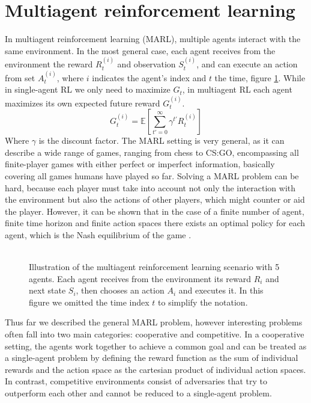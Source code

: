 \section{Multiagent reinforcement learning}
In multiagent reinforcement learning (MARL), multiple agents interact with the same environment. In the most general case, each agent receives from the environment the reward $R_t^{(i)}$ and observation $S_t^{(i)}$, and can execute an action from set $A_t^{(i)}$, where $i$ indicates the agent's index and $t$ the time, figure \ref{fig:marl}. While in single-agent RL we only need to maximize $G_t$, in multiagent RL each agent maximizes its own expected future reward $G_t^{(i)}$.
\begin{equation}
    G_t^{(i)} = \mathbb{E}\left[ \sum_{t'=0}^{\infty} \gamma^{t'} R_t^{(i)} \right]
    \label{eq:marl-gt}
\end{equation}    
Where $\gamma$ is the discount factor.
The MARL setting is very general, as it can describe a wide range of games, ranging from chess to CS:GO, encompassing all finite-player games with either perfect or imperfect information, basically covering all games humans have played so far. Solving a MARL problem can be hard, because each player must take into account not only the interaction with the environment but also the actions of other players, which might counter or aid the player. However, it can be shown that in the case of a finite number of agent, finite time horizon and finite action spaces there exists an optimal policy for each agent, which is the Nash equilibrium of the game \cite{nash-equilibrium-wikipedia}.\\\\
\begin{figure}[H]
    \centering
    
    \caption{Illustration of the multiagent reinforcement learning scenario with 5 agents. Each agent receives from the environment its reward $R_i$ and next state $S_i$, then chooses an action $A_i$ and executes it. In this figure we omitted the time index $t$ to simplify the notation.}
    \label{fig:marl}
\end{figure}
Thus far we described the general MARL problem, however interesting problems often fall into two main categories: cooperative and competitive. In a cooperative setting, the agents work together to achieve a common goal and can be treated as a single-agent problem by defining the reward function as the sum of individual rewards and the action space as the cartesian product of individual action spaces. In contrast, competitive environments consist of adversaries that try to outperform each other and cannot be reduced to a single-agent problem.\\\\
